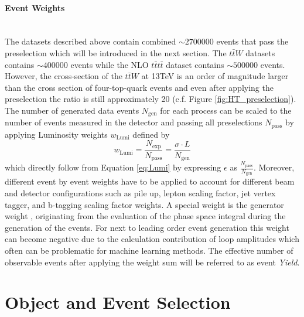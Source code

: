 \paragraph{Event Weights} \mbox{} \\

The datasets described above contain combined $\sim 2700000$ events that pass the preselection which will be introduced in the next section. The $t\bar{t}W$ datasets contains $\sim 400000$ events while the NLO $t\bar{t}t\bar{t}$ dataset contains $\sim 500000$ events. However, the cross-section of the $t\bar{t}W$ at 13TeV is an order of magnitude larger than the cross section of four-top-quark events and even after applying the preselection the ratio is still approximately 20 (c.f. Figure \ref{fig:HT_preselection}). The number of generated data events $N_{\text{gen}}$ for each process can be scaled to the number of events measured in the detector and passing all preselections $N_{\text{pass}}$ by applying Luminosity weights $w _{\text{Lumi}}$ defined by
\begin{equation}
\label{eq:weights}
w _{\text{Lumi}} = \frac{N_{\text{exp}}}{N_{\text{pass}}} = \frac{\sigma \cdot L}{N_{\text{gen}}}
\end{equation}
which directly follow from Equation \ref{eq:Lumi} by expressing $\epsilon$ as $\frac{N_{\text{pass}}}{N_{\text{gen}}}$. Moreover, different event by event weights have to be applied to account for different beam and detector configurations such as pile up, lepton scaling factor, jet vertex tagger, and b-tagging scaling factor weights. A special weight is the generator weight \cite{PDG2020}, originating from the evaluation of the phase space integral during the generation of the events. For next to leading order event generation this weight can become negative due to the calculation contribution of loop amplitudes \cite{nWeights} which often can be problematic for machine learning methods. The effective number of observable events after applying the weight sum will be referred to as event \textit{Yield}.

\section{Object and Event Selection}
\label{sec:EventSelection}


